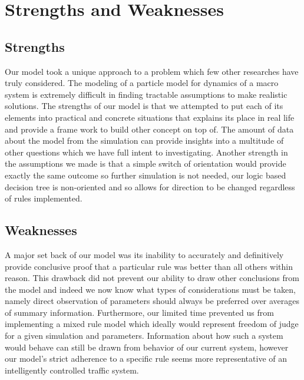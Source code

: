 \documentclass{amsart}
\begin{document}
\section{\bfseries{Strengths and Weaknesses}}

	\subsection{Strengths}
		Our model took a unique approach to a problem which few other researches have truly considered. The modeling of a particle model for dynamics of a macro system is extremely difficult in finding tractable assumptions to make realistic solutions. The strengths of our model is that we attempted to put each of its elements into practical and concrete situations that explains its place in real life and  provide a frame work to build other concept on top of. The amount of data about the model from the simulation can provide insights into a multitude of other questions which we have full intent to investigating. Another strength in the assumptions we made is that a simple switch of orientation would provide exactly the same outcome so further simulation is not needed, our logic based decision tree is non-oriented and so allows for direction to be changed regardless of rules implemented.
		
	\subsection{Weaknesses}
		A major set back of our model was its inability to accurately and definitively provide conclusive proof that a particular rule was better than all others within reason. This drawback did not prevent our ability to draw other conclusions from the model and indeed we now know what types of considerations must be taken, namely direct observation of parameters should always be preferred over averages of summary information. Furthermore, our limited time prevented us from implementing a mixed rule model which ideally would represent freedom of judge for a given simulation and parameters. Information about how such a system would behave can still be drawn from behavior of our current system, however our model's strict adherence to a specific rule seems more representative of an intelligently controlled traffic system.
		 
\end{document}
